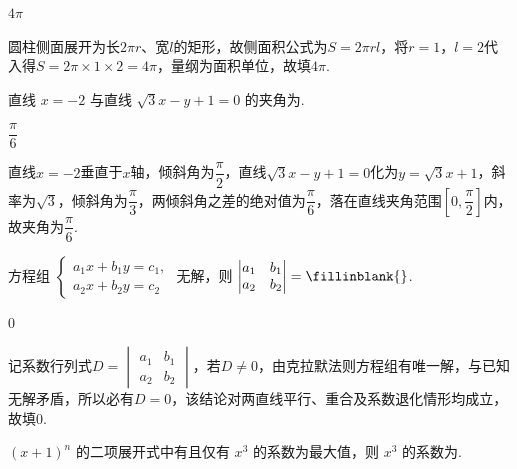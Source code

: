 \begin{answer}
\(4\pi\)
\end{answer}

\begin{solution}
圆柱侧面展开为长\(2\pi r\)、宽\(l\)的矩形，故侧面积公式为\(S=2\pi rl\)，将\(r=1\)，\(l=2\)代入得\(S=2\pi\times 1\times 2=4\pi\)，量纲为面积单位，故填\(4\pi\).
\end{solution}

\begin{problem}
直线 \(x=-2\) 与直线 \(\sqrt3x-y+1=0\) 的夹角为\fillinblank{}.
\end{problem}

\begin{answer}
\(\dfrac{\pi}{6}\)
\end{answer}

\begin{solution}
直线\(x=-2\)垂直于\(x\)轴，倾斜角为\(\dfrac{\pi}{2}\)，直线\(\sqrt{3}x-y+1=0\)化为\(y=\sqrt{3}x+1\)，斜率为\(\sqrt{3}\)，倾斜角为\(\dfrac{\pi}{3}\)，两倾斜角之差的绝对值为\(\dfrac{\pi}{6}\)，落在直线夹角范围\(\left[ 0,\dfrac{\pi}{2} \right]\)内，故夹角为\(\dfrac{\pi}{6}\).
\end{solution}

\begin{problem}
方程组 \(\begin{cases}
a_1x+b_1y=c_1,\\
a_2x+b_2y=c_2
\end{cases}\) 无解，则 \(\begin{vmatrix}a_1&b_1\\a_2&b_2\end{vmatrix}=\fillinblank{}\).
\end{problem}

\begin{answer}
\(0\)
\end{answer}

\begin{solution}
记系数行列式\(D=\begin{vmatrix}a_1 & b_1\\a_2 & b_2\end{vmatrix}\)，若\(D\ne 0\)，由克拉默法则方程组有唯一解，与已知无解矛盾，所以必有\(D=0\)，该结论对两直线平行、重合及系数退化情形均成立，故填\(0\).
\end{solution}

\begin{problem}
\((x+1)^n\) 的二项展开式中有且仅有 \(x^3\) 的系数为最大值，则 \(x^3\) 的系数为\fillinblank{}.
\end{problem}

